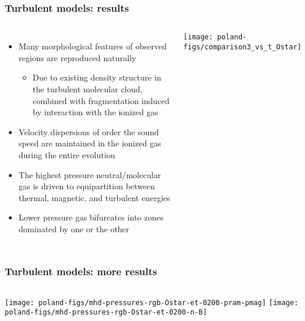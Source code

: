 \documentclass[presentation]{beamer}
\begin{document}
\begin{frame}
  \frametitle{Turbulent models: results}
  \begin{columns}
    \begin{itemize}
    \item Many morphological features of observed \hii{} regions are
      reproduced naturally
      \begin{itemize}
      \item Due to existing density structure in the
        turbulent molecular cloud, combined with fragmentation induced
        by interaction with the ionized gas
      \end{itemize}
    \item Velocity dispersions of order the sound speed are
      maintained in the ionized gas during the entire evolution
    \item The highest pressure neutral/molecular gas is driven to
      equipartition between thermal, magnetic, and turbulent energies
    \item Lower pressure gas bifurcates into zones dominated by one or
      the other
    \end{itemize}
    \texttt{[image: poland-figs/comparison3\_vs\_t\_Ostar]}%
  \end{columns}
\end{frame}

\begin{frame}
  \frametitle{Turbulent models: more results}
  \begin{columns}
    \texttt{[image: poland-figs/mhd-pressures-rgb-Ostar-et-0200-pram-pmag]}
    \texttt{[image: poland-figs/mhd-pressures-rgb-Ostar-et-0200-n-B]}
  \end{columns}
\end{frame}
\end{document}
